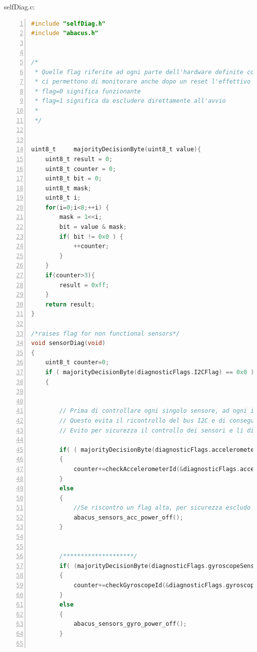 \documentclass[LaM,binding=0.6cm,oneside]{../sapthesis}
\begin{document}
selfDiag.c:
\begin{lstlisting}[language=C,
                   basicstyle=\scriptsize,
                   numbers=left,
                   stepnumber=0,
                   numbersep=4pt,
                   tabsize=2,
                   showspaces=false,
                   showstringspaces=false]
#include "selfDiag.h"
#include "abacus.h"


/*
 * Quelle flag riferite ad ogni parte dell'hardware definite come persistent
 * ci permettono di monitorare anche dopo un reset l'effettivo funzionamento.
 * flag=0 significa funzionante
 * flag=1 significa da escludere direttamente all'avvio
 *
 */


uint8_t     majorityDecisionByte(uint8_t value){
    uint8_t result = 0;
    uint8_t counter = 0;
    uint8_t bit = 0;
    uint8_t mask;
    uint8_t i;
    for(i=0;i<8;++i) {
        mask = 1<<i;
        bit = value & mask;
        if( bit != 0x0 ) {
            ++counter;
        }
    }
    if(counter>3){
        result = 0xff;
    }
    return result;
}

/*raises flag for non functional sensors*/
void sensorDiag(void)
{
    uint8_t counter=0;
    if ( majorityDecisionByte(diagnosticFlags.I2CFlag) == 0x0 )
    {


        // Prima di controllare ogni singolo sensore, ad ogni iterazione si esegue un controllo sul bus I2C condiviso tra tutti i sottosistemi interrogati.
        // Questo evita il ricontrollo del bus I2C e di conseguenza un possibile overflow al contatore (verrebbe sommato per n volte 0x80
        // Evito per sicurezza il controllo dei sensori e li disabilito a priori nel caso in cui il bus non sia funzionante

        if( ( majorityDecisionByte(diagnosticFlags.accelerometerSensorFlag) == 0x0) )
        {
            counter+=checkAccelerometerId(&diagnosticFlags.accelerometerSensorFlag);
        }
        else
        {
            //Se riscontro un flag alta, per sicurezza escludo il sensore
            abacus_sensors_acc_power_off();
        }


        /********************/
        if( (majorityDecisionByte(diagnosticFlags.gyroscopeSensorFlag)==0x0) )
        {
            counter+=checkGyroscopeId(&diagnosticFlags.gyroscopeSensorFlag);
        }
        else
        {
            abacus_sensors_gyro_power_off();
        }


\end{lstlisting}
\end{document}
